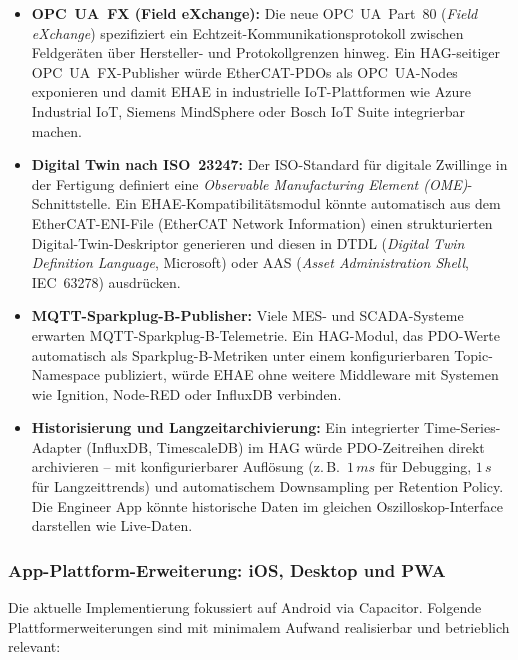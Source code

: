 ﻿\documentclass[12pt,a4paper]{article}
\begin{document}
\begin{itemize}[leftmargin=2em]
  \item \textbf{OPC~UA~FX (Field eXchange):} Die neue OPC~UA~Part~80
    (\emph{Field eXchange}) spezifiziert ein Echtzeit-Kommunikationsprotokoll
    zwischen Feldgeräten über Hersteller- und Protokollgrenzen hinweg. Ein
    HAG-seitiger OPC~UA~FX-Publisher würde Ether\-CAT-PDOs als
    OPC~UA-Nodes exponieren und damit EHAE in industrielle IoT-Plattformen
    wie Azure Industrial IoT, Siemens MindSphere oder Bosch IoT Suite
    integrierbar machen.
  \item \textbf{Digital Twin nach ISO~23247:} Der ISO-Standard für digitale
    Zwillinge in der Fertigung definiert eine \emph{Observable Manufacturing
    Element (OME)}-Schnittstelle. Ein EHAE-Kompatibilitätsmodul könnte
    automatisch aus dem EtherCAT-ENI-File (EtherCAT Network Information) einen
    strukturierten Digital-Twin-Deskriptor generieren und diesen in
    DTDL (\emph{Digital Twin Definition Language}, Microsoft) oder
    AAS (\emph{Asset Administration Shell}, IEC~63278) ausdrücken.
  \item \textbf{MQTT-Sparkplug-B-Publisher:} Viele MES- und SCADA-Systeme
    erwarten MQTT-Sparkplug-B-Telemetrie. Ein HAG-Modul, das PDO-Werte
    automatisch als Sparkplug-B-Metriken unter einem konfigurierbaren
    Topic-Namespace publiziert, würde EHAE ohne weitere Middleware mit
    Systemen wie Ignition, Node-RED oder InfluxDB verbinden.
  \item \textbf{Historisierung und Langzeitarchivierung:} Ein integrierter
    Time-Series-Adapter (InfluxDB, TimescaleDB) im HAG würde PDO-Zeitreihen
    direkt archivieren -- mit konfigurierbarer Auflösung (z.\,B.\ $1\,\si{ms}$
    für Debugging, $1\,\si{s}$ für Langzeittrends) und automatischem Downsampling
    per Retention Policy. Die Engineer App könnte historische Daten im gleichen
    Oszilloskop-Interface darstellen wie Live-Daten.
\end{itemize}

\subsubsection*{App-Plattform-Erweiterung: iOS, Desktop und PWA}

Die aktuelle Implementierung fokussiert auf Android via Capacitor. Folgende
Plattformerweiterungen sind mit minimalem Aufwand realisierbar und betrieblich
relevant:
\end{document}
